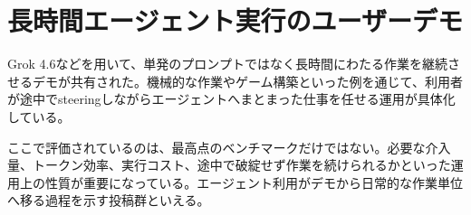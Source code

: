 \section{長時間エージェント実行のユーザーデモ}

Grok 4.6などを用いて、単発のプロンプトではなく長時間にわたる作業を継続させるデモが共有された。機械的な作業やゲーム構築といった例を通じて、利用者が途中でsteeringしながらエージェントへまとまった仕事を任せる運用が具体化している。

ここで評価されているのは、最高点のベンチマークだけではない。必要な介入量、トークン効率、実行コスト、途中で破綻せず作業を続けられるかといった運用上の性質が重要になっている。エージェント利用がデモから日常的な作業単位へ移る過程を示す投稿群といえる。
